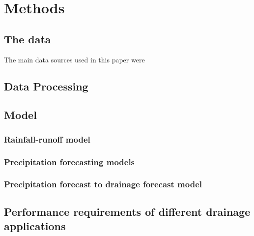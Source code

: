 \chapter{Methods} \label{sec:Methods}

\section{The data}

The main data sources used in this paper were 
 
\section{Data Processing}
\section{Model}
\subsection{Rainfall-runoff model}
\subsection{Precipitation forecasting models}
\subsection{Precipitation forecast to drainage forecast model}
\section{Performance requirements of different drainage applications}
